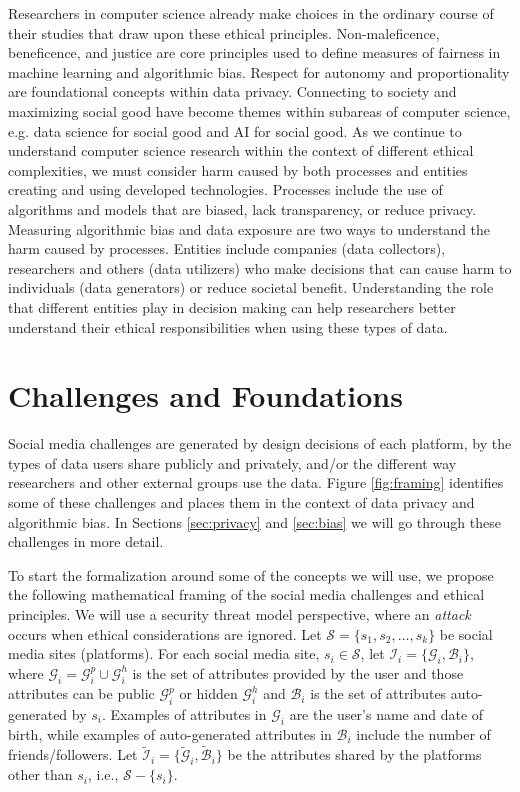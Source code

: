 \documentclass[11pt]{article} %
\begin{document}
Researchers in computer science already make choices in the ordinary course of their studies that draw upon these ethical principles.  Non-maleficence, beneficence, and justice are core principles used to define measures of fairness in machine learning and algorithmic bias. Respect for autonomy and proportionality are foundational concepts within data privacy. Connecting to society and maximizing social good have become themes within subareas of computer science, e.g. data science for social good and AI for social good. As we continue to understand computer science research within the context of different ethical complexities, we must consider harm caused by both processes and entities creating and using developed technologies. Processes include the use of algorithms and models that are biased, lack transparency, or reduce privacy. Measuring algorithmic bias and data exposure are two ways to understand the harm caused by processes. Entities include companies (data collectors), researchers and others (data utilizers) who make decisions that can cause harm to individuals (data generators) or reduce societal benefit. Understanding the role that different entities play in decision making can help researchers better understand their ethical responsibilities when using these types of data. 

\section{Challenges and Foundations}
\label{sec:notation}
Social media challenges are generated by design decisions of each platform, by the types of data users share publicly and privately, and/or the different way researchers and other external groups use the data. Figure \ref{fig:framing} identifies some of these challenges and places them in the context of data privacy and algorithmic bias. In Sections \ref{sec:privacy} and \ref{sec:bias} we will go through these challenges in more detail. 

To start the formalization around some of the concepts we will use, we propose the following mathematical framing of the social media challenges and ethical principles. We will use a security threat model perspective, where an \textit{attack} occurs when ethical considerations are ignored. Let $\mathcal{S} = \{s_1, s_2, \ldots, s_k\}$ be social media sites (platforms). For each social media site, $s_i \in \mathcal{S}$, let $\mathcal{I}_i=\{\mathcal{G}_i, \mathcal{B}_i\}$, where $\mathcal{G}_i = \mathcal{G}^p_i \cup \mathcal{G}^h_i$ is the set of attributes provided by the user and those attributes can be public $\mathcal{G}^p_i$ or hidden $\mathcal{G}^h_i$ and $\mathcal{B}_i$ is the set of attributes auto-generated by  $s_i$. Examples of attributes in $\mathcal{G}_i$ are the user's name and date of birth, while examples of auto-generated attributes in $\mathcal{B}_i$ include the number of friends/followers. Let $\widetilde{\mathcal{I}}_i = \{\widetilde{\mathcal{G}}_i, \widetilde{\mathcal{B}}_i\}$ be the attributes shared by the platforms other than $s_i$, i.e., $\mathcal{S} - \{s_i\}$. 
\end{document}
